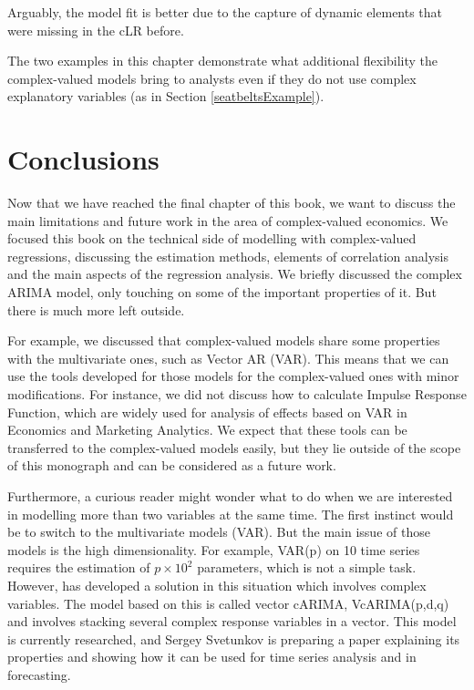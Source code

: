 \documentclass[
]{book}
\begin{document}
Arguably, the model fit is better due to the capture of dynamic elements that were missing in the cLR before.

The two examples in this chapter demonstrate what additional flexibility the complex-valued models bring to analysts even if they do not use complex explanatory variables (as in Section \ref{seatbeltsExample}).

\hypertarget{conclusions}{%
\chapter*{Conclusions}\label{conclusions}}

Now that we have reached the final chapter of this book, we want to discuss the main limitations and future work in the area of complex-valued economics. We focused this book on the technical side of modelling with complex-valued regressions, discussing the estimation methods, elements of correlation analysis and the main aspects of the regression analysis. We briefly discussed the complex ARIMA model, only touching on some of the important properties of it. But there is much more left outside.

For example, we discussed that complex-valued models share some properties with the multivariate ones, such as Vector AR (VAR). This means that we can use the tools developed for those models for the complex-valued ones with minor modifications. For instance, we did not discuss how to calculate Impulse Response Function, which are widely used for analysis of effects based on VAR in Economics and Marketing Analytics. We expect that these tools can be transferred to the complex-valued models easily, but they lie outside of the scope of this monograph and can be considered as a future work.

Furthermore, a curious reader might wonder what to do when we are interested in modelling more than two variables at the same time. The first instinct would be to switch to the multivariate models (VAR). But the main issue of those models is the high dimensionality. For example, VAR(p) on 10 time series requires the estimation of \(p \times 10^2\) parameters, which is not a simple task. However, \citet{SvetunkovSergey} has developed a solution in this situation which involves complex variables. The model based on this is called vector cARIMA, VcARIMA(p,d,q) and involves stacking several complex response variables in a vector. This model is currently researched, and Sergey Svetunkov is preparing a paper explaining its properties and showing how it can be used for time series analysis and in forecasting.
\end{document}
